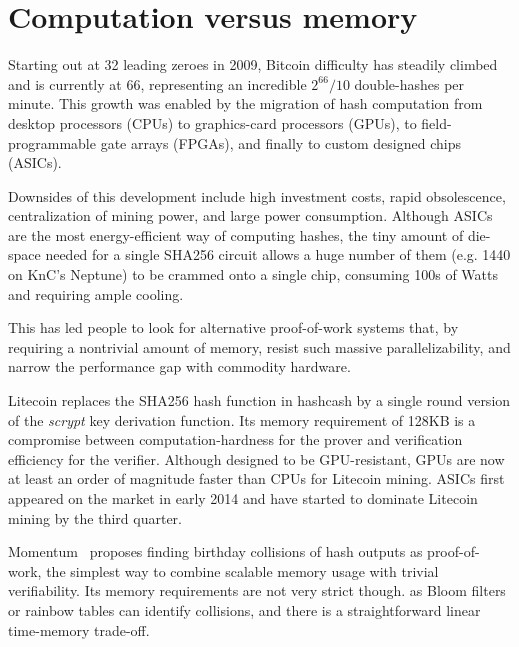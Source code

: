 \documentclass[11pt, oneside]{article}
\begin{document}
\section{Computation versus memory}
Starting out at 32 leading zeroes in 2009, Bitcoin difficulty
has steadily climbed and is currently
at 66, representing an incredible $2^{66}/10$ double-hashes per minute.
This growth was enabled by the migration of hash computation from 
desktop processors (CPUs) to graphics-card processors (GPUs),
to field-programmable gate arrays (FPGAs), and finally to custom designed
chips (ASICs).

Downsides of this development include high investment costs, rapid
obsolescence, centralization of mining power, and large power consumption.
Although ASICs are the most energy-efficient way of computing hashes,
the tiny amount of die-space needed for a single SHA256 circuit allows
a huge number of them (e.g. 1440 on KnC's Neptune) to be crammed onto a
single chip, consuming 100s of Watts and requiring ample cooling.

This has led people to look for alternative proof-of-work systems
that, by requiring a nontrivial amount of memory, resist such
massive parallelizability, and narrow the performance gap
with commodity hardware.

Litecoin replaces the SHA256 hash function in hashcash by a single round
version of the {\em scrypt} key derivation function. Its memory requirement
of 128KB is a compromise between computation-hardness for the prover and
verification efficiency for the verifier. Although designed to be
GPU-resistant, GPUs are now at least an order of magnitude faster
than CPUs for Litecoin mining. ASICs first appeared on the market in early 2014
and have started to dominate Litecoin mining by the third quarter.

Momentum~\cite{larimer2013} proposes finding birthday collisions of hash
outputs as proof-of-work, the simplest way to combine scalable memory usage
with trivial verifiability. Its memory requirements are not very strict
though. as Bloom filters or rainbow tables can identify collisions, and
there is a straightforward linear time-memory trade-off.
\end{document}
